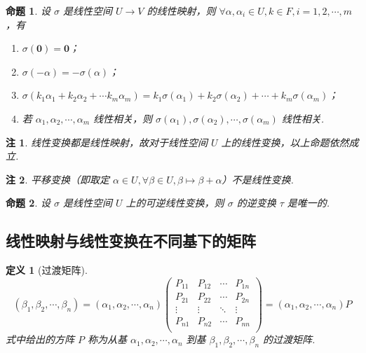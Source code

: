 \documentclass[zihao=-4,UTF8,linespread=1.8,nothm]{aytony_base}
\newtheorem{proposition}{\indent 命题}[subsection]
\newtheorem{definition}{\indent 定义}[subsection]
\newtheorem*{remark}{\indent 注}
\begin{document}
\begin{proposition}
    设 $\sigma$ 是线性空间 $U \to V$ 的线性映射，则 $\forall \alpha, \alpha_i \in U, k \in F, i = 1, 2, \cdots, m$，有

    \begin{enumerate}[nosep]
        \item $\sigma(\mathbf{0}) = \mathbf{0}$；
        \item $\sigma(-\alpha) = -\sigma(\alpha)$；
        \item $\sigma(k_1\alpha_1 + k_2\alpha_2 + \cdots k_m\alpha_m) = k_1\sigma(\alpha_1) + k_2\sigma(\alpha_2) + \cdots + k_m\sigma(\alpha_m)$；
        \item 若 $\alpha_1, \alpha_2, \cdots, \alpha_m$ 线性相关，则 $\sigma(\alpha_1), \sigma(\alpha_2), \cdots, \sigma(\alpha_m)$ 线性相关.
    \end{enumerate}
\end{proposition}

\begin{remark}
    线性变换都是线性映射，故对于线性空间 $U$ 上的线性变换，以上命题依然成立.
\end{remark}

\begin{remark}
    平移变换（即取定 $\alpha \in U, \forall \beta \in U, \beta \mapsto \beta + \alpha$）不是线性变换.
\end{remark}

\begin{proposition}
    设 $\sigma$ 是线性空间 $U$ 上的可逆线性变换，则 $\sigma$ 的逆变换 $\tau$ 是唯一的.
\end{proposition}

\subsection{线性映射与线性变换在不同基下的矩阵}

\begin{definition}[过渡矩阵]
    $$
        (\beta_1, \beta_2, \cdots, \beta_n) = (\alpha_1, \alpha_2, \cdots, \alpha_n)\left(
        \begin{matrix}
                P_{11} & P_{12} & \cdots & P_{1n} \\
                P_{21} & P_{22} & \cdots & P_{2n} \\
                \vdots & \vdots & \ddots & \vdots \\
                P_{n1} & P_{n2} & \cdots & P_{nn} \\
            \end{matrix}
        \right) = (\alpha_1, \alpha_2, \cdots, \alpha_n)P
    $$ 式中给出的方阵 $P$ 称为从基 $\alpha_1, \alpha_2, \cdots, \alpha_n$ 到基 $\beta_1, \beta_2, \cdots, \beta_n$ 的过渡矩阵.
\end{definition}
\end{document}
